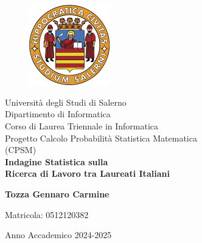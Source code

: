 \documentclass[14pt, openany, titlepage]{report} %
\begin{document}

\begin{titlepage}
\begin{center}
    \begin{figure}
        \includegraphics[width=3.5cm, height=3.5cm]{unisa.png}
        \centering
    \end{figure}
    {\Large Università degli Studi di Salerno}\\[0.2truecm]
    {\large Dipartimento di Informatica\\Corso di Laurea Triennale in Informatica}\\
    \hrulefill
    \vfill
    {\large Progetto Calcolo Probabilità Statistica Matematica\\(CPSM)}\\[0.1truecm]
    \vfill\vfill
    {\LARGE {\bf Indagine Statistica sulla\\[0.1truecm]Ricerca di Lavoro tra Laureati Italiani}}
    \vfill\vfill
    
    \hfill  \textbf{Tozza Gennaro Carmine}
    \centerline{\hfill Matricola: 0512120382}
    
    \vfill
    \hrulefill 
    \begin{center} Anno Accademico 2024-2025 \end{center}
\end{center}
\end{titlepage}

\tableofcontents
\end{document}
